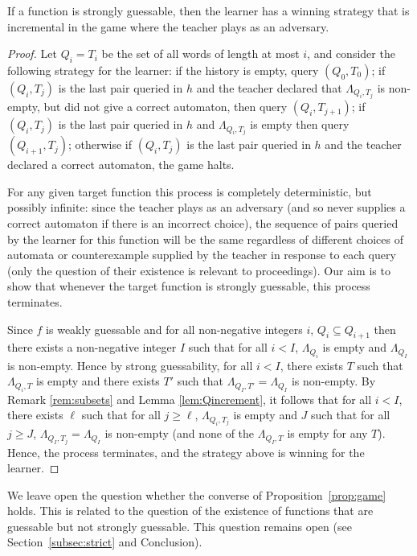 \documentclass{lmcs}
\numberwithin{theorem}{section}
\begin{document}
\begin{prop}
\label{prop:game}If a function is strongly guessable, then the learner has a winning strategy that is incremental in the game where the teacher plays as an adversary.
\end{prop}

\begin{proof}
Let $Q_i = T_i$ be the set of all words of length at most $i$, and consider the following strategy for the learner: if the history is empty, query $(Q_0,T_0)$; if $(Q_i, T_j)$ is the last pair queried in $h$ and the teacher declared that $\Lambda_{Q_i,T_j}$ is non-empty, but did not give a correct automaton, then query $(Q_i, T_{j+1})$; if $(Q_i, T_j)$ is the last pair queried in $h$ and $\Lambda_{Q_i,T_j}$ is empty then query $(Q_{i+1}, T_{j})$; otherwise if $(Q_i, T_j)$ is the last pair queried in $h$ and the teacher declared a correct automaton, the game halts.

For any given target function this process is completely deterministic, but possibly infinite: since the teacher plays as an adversary (and so never supplies a correct automaton if there is an incorrect choice), the sequence of pairs queried by the learner for this function will be the same regardless of different choices of automata or counterexample supplied by the teacher in response to each query (only the question of their existence is relevant to proceedings). Our aim is to show that whenever the target function is strongly guessable, this process terminates. 

Since $f$ is weakly guessable and for all non-negative integers $i$, $Q_i \subseteq Q_{i+1}$ then there exists a non-negative integer $I$ such that for all $i< I$, $\Lambda_{Q_i}$ is empty and $\Lambda_{Q_I}$ is non-empty. Hence by strong guessability, for all $i< I$, there exists $T$ such that $\Lambda_{Q_i,T}$ is empty and there exists $T'$ such that $\Lambda_{Q_I,T'} = \Lambda_{Q_I}$ is non-empty. By Remark \ref{rem:subsets} and Lemma \ref{lem:Qincrement}, it follows that for all $i< I$, there exists $\ell$ such that for all $j\geq \ell$, $\Lambda_{Q_i,T_j}$ is empty and $J$ such that for all $j\geq J$, $\Lambda_{Q_I,T_j} = \Lambda_{Q_I}$ is non-empty (and none of the $\Lambda_{Q_I,T}$ is empty for any $T$).
Hence, the process terminates, and the strategy above is winning for the learner.
\end{proof}

\begin{rem}
We leave open the question whether the converse of Proposition~\ref{prop:game} holds. This is related to the question of the existence of functions that are guessable but not strongly guessable. This question remains open (see Section~\ref{subsec:strict} and Conclusion).
\end{rem}
\end{document}
